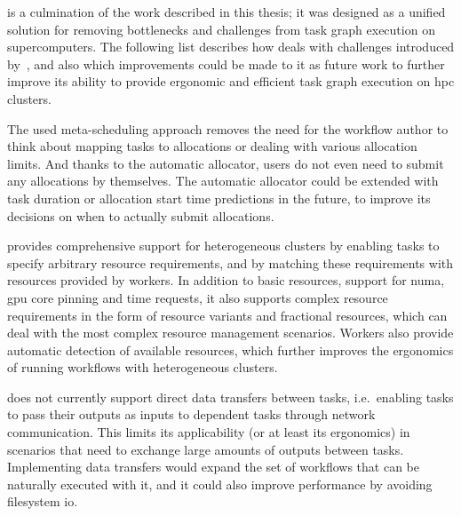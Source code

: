 \hyperqueue{} is a culmination of the work described in this thesis; it was
designed as a unified solution for removing bottlenecks and challenges from task graph execution on
supercomputers. The following list describes how \hyperqueue{} deals with challenges
introduced by~, and also which improvements could be made to it as future
work to further improve its ability to provide ergonomic and efficient task graph execution on
\gls{hpc} clusters.
\begin{description}[wide=0pt]
	\item[Interaction with allocation manager] The used meta-scheduling approach removes the need for the workflow author to think about mapping
		tasks to allocations or dealing with various allocation limits. And thanks to the automatic
		allocator, users do not even need to submit any allocations by themselves. The automatic allocator
		could be extended with task duration or allocation start time predictions in the future, to improve
		its decisions on when to actually submit allocations.
	\item[Cluster heterogeneity] \hyperqueue{} provides comprehensive support for heterogeneous
		clusters by enabling tasks to specify arbitrary resource requirements, and by matching these
		requirements with resources provided by workers. In addition to basic resources, support for
		\gls{numa}, \gls{gpu} core pinning and time requests, it also
		supports complex resource requirements in the form of resource variants and fractional resources,
		which can deal with the most complex resource management scenarios. Workers also provide automatic
		detection of available resources, which further improves the ergonomics of running workflows with
		heterogeneous clusters.
	\item[Data transfers] \hyperqueue{} does not currently support direct data transfers
		between tasks, i.e.\ enabling tasks to pass their outputs as inputs to dependent tasks through
		network communication. This limits its applicability (or at least its ergonomics) in scenarios that
		need to exchange large amounts of outputs between tasks. Implementing data transfers would expand
		the set of workflows that can be naturally executed with it, and it could also improve performance
		by avoiding filesystem \gls{io}.


\end{description}
